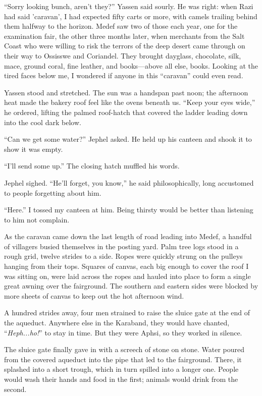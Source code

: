 ``Sorry looking bunch, aren't they?'' Yassen said sourly.  He was right:
when Razi had said 'caravan', I had expected fifty carts or more, with
camels trailing behind them halfway to the horizon.  Medef saw two of
those each year, one for the examination fair, the other three months
later, when merchants from the Salt Coast who were willing to risk the
terrors of the deep desert came through on their way to Ossisswe and
Coriandel.  They brought dayglass, chocolate, silk, mace, ground
coral, fine leather, and books---above all else, books.  Looking at
the tired faces below me, I wondered if anyone in this ``caravan'' could
even read.

Yassen stood and stretched.  The sun was a handspan past noon; the
afternoon heat made the bakery roof feel like the ovens beneath us.
``Keep your eyes wide,'' he ordered, lifting the palmed roof-hatch that
covered the ladder leading down into the cool dark below.

``Can we get some water?'' Jephel asked.  He held up his canteen and
shook it to show it was empty.

``I'll send some up.''  The closing hatch muffled his words.

Jephel sighed.  ``He'll forget, you know,'' he said philosophically,
long accustomed to people forgetting about him.

``Here.''  I tossed my canteen at him.  Being thirsty would be better
than listening to him not complain.

As the caravan came down the last length of road leading into Medef, a
handful of villagers busied themselves in the posting yard.  Palm tree
logs stood in a rough grid, twelve strides to a side.  Ropes were
quickly strung on the pulleys hanging from their tops.  Squares of
canvas, each big enough to cover the roof I was sitting on, were laid
across the ropes and hauled into place to form a single great awning
over the fairground.  The southern and eastern sides were blocked by
more sheets of canvas to keep out the hot afternoon wind.

A hundred strides away, four men strained to raise the sluice gate at
the end of the aqueduct.  Anywhere else in the Karaband, they would
have chanted, ``\emph{Heph...ho!}'' to stay in time.  But they were Aphsi, so
they worked in silence.

The sluice gate finally gave in with a screech of stone on stone.
Water poured from the covered aqueduct into the pipe that led to the
fairground.  There, it splashed into a short trough, which in turn
spilled into a longer one.  People would wash their hands and food in
the first; animals would drink from the second.

